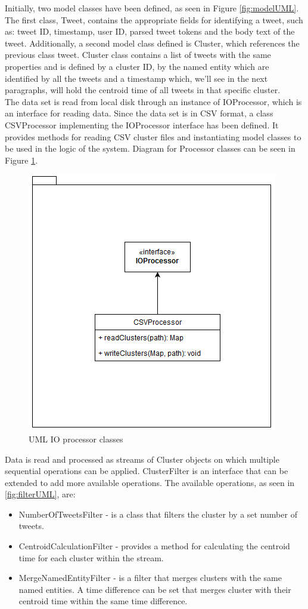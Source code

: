 \documentclass[a4paper,portrait,12pt]{article}
\begin{document}
Initially, two model classes have been defined, as seen in Figure \ref{fig:modelUML}. The first class, Tweet, contains the appropriate fields for identifying a tweet, such as: tweet ID, timestamp, user ID, parsed tweet tokens and the body text of the tweet. 
Additionally, a second model class defined is Cluster, which references the previous class tweet. Cluster class contains a list of tweets with the same properties and is defined by a cluster ID, by the named entity which are identified by all the tweets and a timestamp which, we'll see in the next paragraphs, will hold the centroid time of all tweets in that specific cluster.\\

The data set is read from local disk through an instance of IOProcessor, which is an interface for reading data.
Since the data set is in CSV format, a class CSVProcessor implementing the IOProcessor interface has been defined. 
It provides methods for reading CSV cluster files and instantiating model classes to be used in the logic of the system.
Diagram for Processor classes can be seen in Figure \ref{fig:processorUML}. \\

\begin{figure}[h!]
    \centering
    \includegraphics[width=0.5\linewidth]{images/processorUML.png}
  \caption{UML IO processor classes}
  \label{fig:processorUML}
\end{figure}

Data is read and processed as streams of Cluster objects on which multiple sequential operations can be applied. 
ClusterFilter is an interface that can be extended to add more available operations. The available operations, as seen in \ref{fig:filterUML}, are:
\begin{itemize}
    \item NumberOfTweetsFilter - is a class that filters the cluster by a set number of tweets.
    \item CentroidCalculationFilter - provides a method for calculating the centroid time for each cluster within the stream.
    \item MergeNamedEntityFilter - is a filter that merges clusters with the same named entities. A time difference can be set that merges cluster with their centroid time within the same time difference.
\end{itemize}
\end{document}
